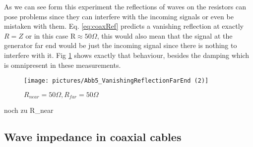 \documentclass[a4paper,10pt,twocolumn]{article}
\begin{document}
    As we can see form this experiment the reflections of waves on the resistors can pose problems since they can interfere with the incoming signals or even be mistaken with them.
    Eq. \ref{eq:coaxRef} predicts a vanishing reflection at exactly $R=Z$ or in this case R$\approx 50\Omega$, this would also mean that the signal at the generator far end would be just the incoming signal since there is nothing to interfere with it.
    Fig \ref{fig:VanishingReflectionFarEnd} shows exactly that behaviour, besides the damping which is omnipresent in these measurements.
    \begin{figure}[htbp]                                 
        \begin{center}                                       
            \texttt{[image: pictures/Abb5\_VanishingReflectionFarEnd (2)]}      
            \caption[]{$R_{near}=50\Omega, R_{far}=50\Omega $}   %
            \label{fig:VanishingReflectionFarEnd}                                      
        \end{center}
    \end{figure}
    
    noch zu R_{near}
    \subsection{Wave impedance in coaxial cables}
    
\end{document}
